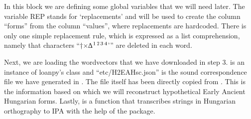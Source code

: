 \documentclass[letterpaper,10pt,english]{sphinxmanual}
\begin{document}
{{{{\begin{sphinxVerbatim}[commandchars=\\\{\}]
  \PYG{p}{[}     \PYG{p}{]}
  
  
  
\end{sphinxVerbatim}

\sphinxAtStartPar
In this block we are defining some global variables that we will need later.
The variable REP stands for ‘replacements’ and will be used to create
the column “forms” from the column “values”, where replacements are hard\sphinxhyphen{}coded.
There is only one simple replacement rule, which is expressed as a list
comprehension, namely that characters “†×∆\sphinxhyphen{}\(\sp{\text{1}}\)\(\sp{\text{2}}\)\(\sp{\text{3}}\)\(\sp{\text{4}}\)’” are deleted in each
word.

\sphinxAtStartPar
Next, we are loading the word\sphinxhyphen{}vectors that we have downloaded in step 3.
 is an instance of
loanpy’s 
class and “etc/H2EAHsc.json” is the sound correspondence file
we have generated in .
The file itself has been directly copied from
. This is the information based
on which we will reconstruct hypothetical Early Ancient Hungarian forms.
Lastly,  is a function that transcribes strings in Hungarian
orthography to IPA with the help of the  package.

\begin{sphinxVerbatim}[commandchars=\\\{\}]
 
      
      
      
\end{sphinxVerbatim}

}}}}
\end{document}
